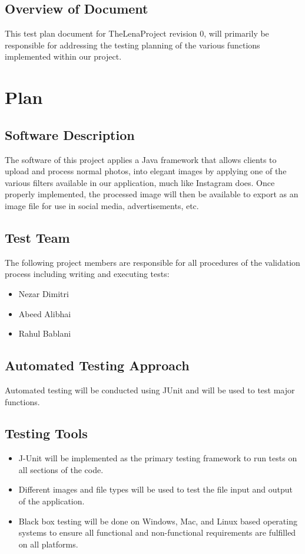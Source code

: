\documentclass[12pt, titlepage]{article}
\begin{document}
\subsection{Overview of Document}
This test plan document for TheLenaProject revision 0, will primarily be responsible for addressing the testing planning of the various functions implemented within our project.

\section{Plan}
	
\subsection{Software Description}

The software of this project applies a Java framework that allows clients to upload and process normal photos, into elegant images by applying one of the various filters available in our application, much like Instagram does. Once properly implemented, the processed image will then be available to export as an image file for use in social media, advertisements, etc.

\subsection{Test Team}

The following project members are responsible for all procedures of the validation
process including writing and executing tests:

\begin{itemize}
\item{Nezar Dimitri}
\item{Abeed Alibhai}
\item{Rahul Bablani}
\end{itemize}

\subsection{Automated Testing Approach}

Automated testing will be conducted using JUnit and will be used to test major functions.

\subsection{Testing Tools}
\begin{itemize}
\item J-Unit will be implemented as the primary testing framework to run tests on all sections of the code.
\item Different images and file types will be used to test the file input and output of the application.
\item Black box testing will be done on Windows, Mac, and Linux based operating systems to ensure all functional and non-functional requirements are fulfilled on all platforms.
\end{itemize}
\end{document}
